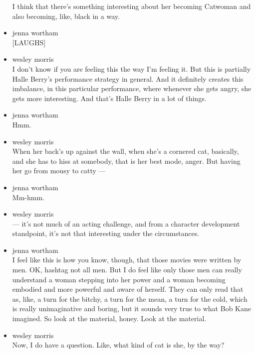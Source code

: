\begin{itemize}
  I think that there's something interesting about her becoming Catwoman
  and also becoming, like, black in a way.
\item
  jenna wortham\\
  {[}LAUGHS{]}
\item
  wesley morris\\
  I don't know if you are feeling this the way I'm feeling it. But this
  is partially Halle Berry's performance strategy in general. And it
  definitely creates this imbalance, in this particular performance,
  where whenever she gets angry, she gets more interesting. And that's
  Halle Berry in a lot of things.
\item
  jenna wortham\\
  Hmm.
\item
  wesley morris\\
  When her back's up against the wall, when she's a cornered cat,
  basically, and she has to hiss at somebody, that is her best mode,
  anger. But having her go from mousy to catty ---
\item
  jenna wortham\\
  Mm-hmm.
\item
  wesley morris\\
  --- it's not much of an acting challenge, and from a character
  development standpoint, it's not that interesting under the
  circumstances.
\item
  jenna wortham\\
  I feel like this is how you know, though, that those movies were
  written by men. OK, hashtag not all men. But I do feel like only those
  men can really understand a woman stepping into her power and a woman
  becoming embodied and more powerful and aware of herself. They can
  only read that as, like, a turn for the bitchy, a turn for the mean, a
  turn for the cold, which is really unimaginative and boring, but it
  sounds very true to what Bob Kane imagined. So look at the material,
  honey. Look at the material.
\item
  wesley morris\\
  Now, I do have a question. Like, what kind of cat is she, by the way?


\end{itemize}

